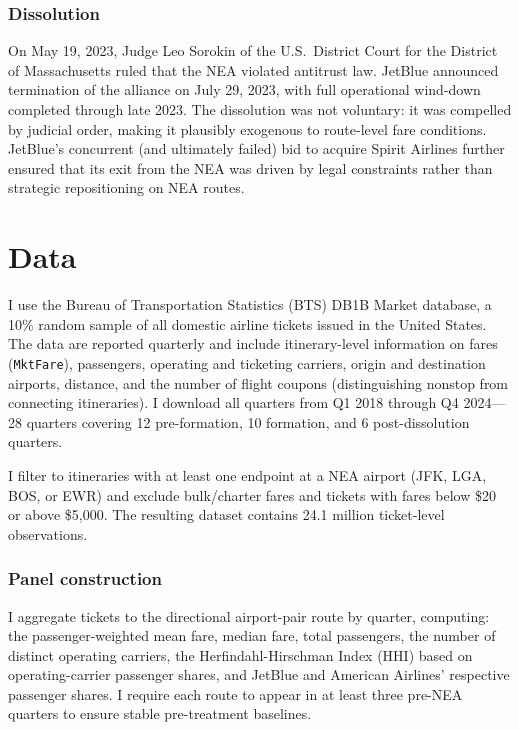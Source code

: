 \documentclass[12pt]{article}
\begin{document}
\subsubsection*{Dissolution} On May 19, 2023, Judge Leo Sorokin of the U.S.\ District Court for the District of Massachusetts ruled that the NEA violated antitrust law. JetBlue announced termination of the alliance on July 29, 2023, with full operational wind-down completed through late 2023. The dissolution was not voluntary: it was compelled by judicial order, making it plausibly exogenous to route-level fare conditions. JetBlue's concurrent (and ultimately failed) bid to acquire Spirit Airlines further ensured that its exit from the NEA was driven by legal constraints rather than strategic repositioning on NEA routes.


\section{Data}

I use the Bureau of Transportation Statistics (BTS) DB1B Market database, a 10\% random sample of all domestic airline tickets issued in the United States. The data are reported quarterly and include itinerary-level information on fares (\texttt{MktFare}), passengers, operating and ticketing carriers, origin and destination airports, distance, and the number of flight coupons (distinguishing nonstop from connecting itineraries). I download all quarters from Q1 2018 through Q4 2024---28 quarters covering 12 pre-formation, 10 formation, and 6 post-dissolution quarters.

I filter to itineraries with at least one endpoint at a NEA airport (JFK, LGA, BOS, or EWR) and exclude bulk/charter fares and tickets with fares below \$20 or above \$5,000. The resulting dataset contains 24.1 million ticket-level observations.

\subsubsection*{Panel construction} I aggregate tickets to the directional airport-pair route by quarter, computing: the passenger-weighted mean fare, median fare, total passengers, the number of distinct operating carriers, the Herfindahl-Hirschman Index (HHI) based on operating-carrier passenger shares, and JetBlue and American Airlines' respective passenger shares. I require each route to appear in at least three pre-NEA quarters to ensure stable pre-treatment baselines.
\end{document}
